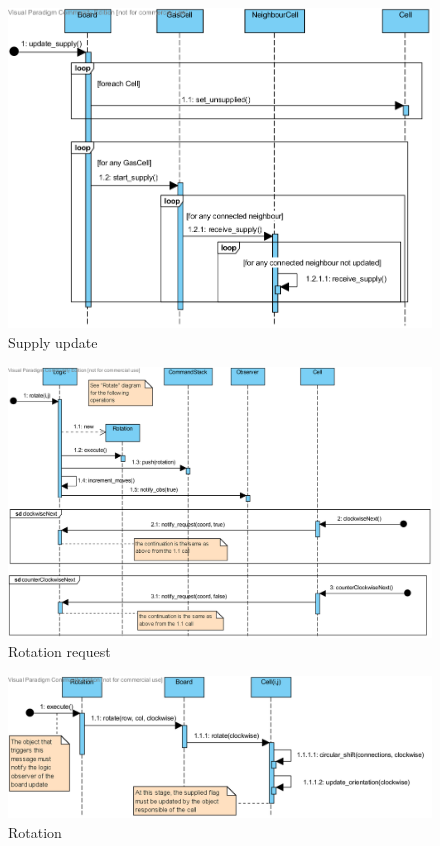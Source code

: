 \documentclass[a4paper,11pt]{article}
\begin{document}
\begin{figure}[h]
	\center
	\includegraphics[angle=90,scale=1]{supply_update.png}
	\caption{Supply update}
	\label{fig:sup_update}
\end{figure}
\begin{figure}[h]
	\center
	\includegraphics[angle=90,scale=1]{rotation_request.png}
	\caption{Rotation request}
	\label{fig:rot_request}
\end{figure}
\begin{figure}[h]
	\center
	\includegraphics[angle=90,scale=1]{rotation.png}
	\caption{Rotation}
	\label{fig:rotation}
\end{figure}
\end{document}
